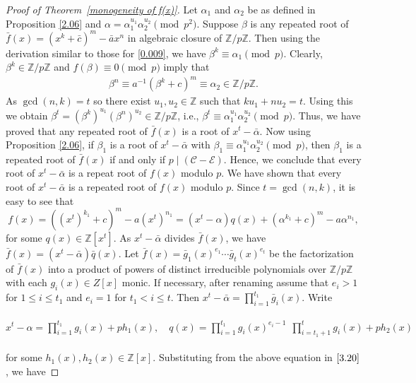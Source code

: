 \documentclass[10pt,a4paper]{amsart}
\newcommand{\Z}{\mathbb{Z}}
\newcommand{\calC}{\mathcal{C}}
\newcommand{\calE}{\mathcal{E}}
\begin{document}
\begin{proof}[Proof of Theorem~\ref{monogeneity of f(x)}]
	Let $\alpha_1$ and $\alpha_2$ be as defined in Proposition \ref{2.06} and $\alpha = \alpha_1^{u_1} \alpha_2^{u_2} \pmod{p^2}$. Suppose $\beta$ is any repeated root of $\bar f (x)= (x^k+\bar c)^m -\bar a x^n$ in algebraic closure of $\Z/p\Z.$ Then using the derivation similar to those for \eqref{0.009}, we have $\beta^k \equiv \alpha_1 \pmod{p}$. Clearly, $\beta^k \in \Z/p\Z$ and $f(\beta)\equiv 0 \pmod{p}$ imply that
	\begin{align*}
		\beta^n \equiv a^{-1} (\beta^k +c)^m \equiv \alpha_{2} \in {\Z/p\Z}.
	\end{align*}
	As ${\gcd(n,k)}=t$ so there exist $u_1,u_2\in\Z$ such that $ku_1+nu_2=t.$ Using this we obtain $\beta^t = (\beta^k)^{u_1}(\beta^n)^{u_2} \in {\Z/p\Z}$, i.e., $\beta^t \equiv \alpha_1^{u_1} \alpha_{2}^{u_2}\pmod{p}$. Thus, we have proved that any repeated root of $\bar f(x)$ is a root of $ x^t-\bar{\alpha}$. 
	Now using Proposition \ref{2.06}, if $\beta_1$ is a root of $x^t-\bar{\alpha}$  with $\beta_1 \equiv \alpha_1^{u_1} \alpha_{2}^{u_2} \pmod{p}$, then $\beta_1$ is a repeated root of $\bar{f}(x)$ if and only if $p\mid (\calC - \calE)$. Hence, we conclude that every root of $x^t-\bar{\alpha}$ is a repeat root of $f(x)$ modulo $p$. We have shown that every root of $x^t - \bar{\alpha}$ is a repeated root of $f(x)$ modulo $p$.  
Since $t=\gcd(n,k)$, it is easy to see that
	\begin{equation}\label{3.20}
		f(x)= ((x^t)^{k_1}+c)^m -a(x^t)^{n_1} = (x^t-\alpha)q(x) +  (\alpha^{k_1}+c)^m - a \alpha^{n_1},
	\end{equation}
	for some $q(x) \in \Z[x^t]$. As $x^t - \bar{\alpha}$ divides $\bar{f}(x)$, we have $\bar{f}(x) = (x^t-\bar{\alpha})\bar{q}(x)$. Let $\bar{f}(x)=\bar g_1(x)^{e_1}\cdots \bar g_t(x)^{e_t}$ be the factorization of $\bar{f}(x)$ into a product of  powers of distinct irreducible polynomials over $\Z /p\Z$ with each $g_{i}(x)\in Z[x]$ monic. If necessary, after renaming assume that $e_{i}>1$ for $1\leq i\leq t_{1}$ and $e_i=1$ for $t_1< i \leq t$. Then  $x^t-\bar{\alpha}=\prod\limits_{i=1}^{t_1}\bar g_i(x)$. Write\\\\
	$x^t-\alpha=\prod\limits_{i=1}^{t_1} g_i(x)+ph_1(x), \quad q(x)=\prod\limits_{i=1}^{t_1}g_i(x)^{e_i-1}~~ \prod\limits_{i=t_1+1}^{t}g_i(x)+ph_2(x)$ \\\\ for some $h_1(x),h_2(x)\in\Z[x]$. Substituting from the above equation in $\eqref{3.20}$, we  have

\end{proof}
\end{document}
